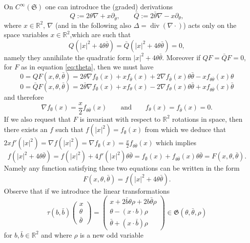 \documentclass[a4paper,10pt]{article}
\newcommand{\assign}{:=}
\newcommand{\tmop}[1]{\ensuremath{\operatorname{#1}}}
\begin{document}
On $C^{\infty} (\mathfrak{S})$ one can introduce the (graded) derivations
\[ Q \assign 2 \theta \nabla + x \partial_{\bar{\theta}}, \qquad \bar{Q}
   \assign 2 \bar{\theta} \nabla - x \partial_{\theta}, \]
where $x \in \mathbb{R}^2$, $\nabla$ (and in the following also $\Delta =
\tmop{div} (\nabla \cdot)$) acts only on the space variables $x \in
\mathbb{R}^2$,which are such that
\[ Q (| x |^2 + 4 \theta \bar{\theta}) = \bar{Q} (| x |^2 + 4 \theta
   \bar{\theta}) = 0, \]
namely they annihilate the quadratic form $| x |^2 + 4 \theta \bar{\theta}$.
Moreover if $Q F = \bar{Q} F = 0$, for $F$ as in equation {\eqref{eq:theta}},
then we must have
\[ 0 = Q F (x, \theta, \bar{\theta}) = 2 \theta \nabla f_{\emptyset} (x) + x
   f_{\bar{\theta}} (x) + 2 \nabla f_{\bar{\theta}} (x) \theta \bar{\theta} -
   x f_{\theta \bar{\theta}} (x) \theta \]
\[ 0 = \bar{Q} F (x, \theta, \bar{\theta}) = 2 \bar{\theta} \nabla
   f_{\emptyset} (x) + x f_{\theta} (x) - 2 \nabla f_{\theta} (x) \theta
   \bar{\theta} + x f_{\theta \bar{\theta}} (x) \bar{\theta} \]
and therefore
\[ \nabla f_{\emptyset} (x) = \frac{x}{2} f_{\theta \bar{\theta}} (x) \qquad
   \text{and} \qquad f_{\theta} (x) = f_{\bar{\theta}} (x) = 0. \]
If we also request that $F$ is invariant with respect to $\mathbb{R}^2$
rotations in space, then there exists an $f$ such that $f (| x |^2) =
f_{\emptyset} (x)$ from which we deduce that $2 x f' (| x |^2) = \nabla f (| x
|^2) = \nabla f_{\emptyset} (x) = \frac{x}{2} f_{\theta \bar{\theta}} (x)$
which implies
\[ f (| x |^2 + 4 \theta \bar{\theta}) = f (| x |^2) + 4 f' (| x |^2) \theta
   \bar{\theta} = f_{\emptyset} (x) + f_{\theta \bar{\theta}} (x) \theta
   \bar{\theta} = F (x, \theta, \bar{\theta}) . \]
Namely any function satisfying these two equations can be written in the form
\[ F (x, \theta, \bar{\theta}) = f (| x |^2 + 4 \theta \bar{\theta}) . \]
Observe that if we introduce the linear transformations
\[ \tau (b, \bar{b}) \left(\begin{array}{c}
     x\\
     \theta\\
     \bar{\theta}
   \end{array}\right) = \left(\begin{array}{c}
     x + 2 \bar{b} \theta \rho + 2 b \bar{\theta} \rho\\
     \theta - (x \cdot b) \rho\\
     \bar{\theta} + (x \cdot \bar{b}) \rho
   \end{array}\right) \in \mathfrak{G} (\theta, \bar{\theta}, \rho) \]
for $b, \bar{b} \in \mathbb{R}^2$ and where $\rho$ is a new odd variable
\end{document}
